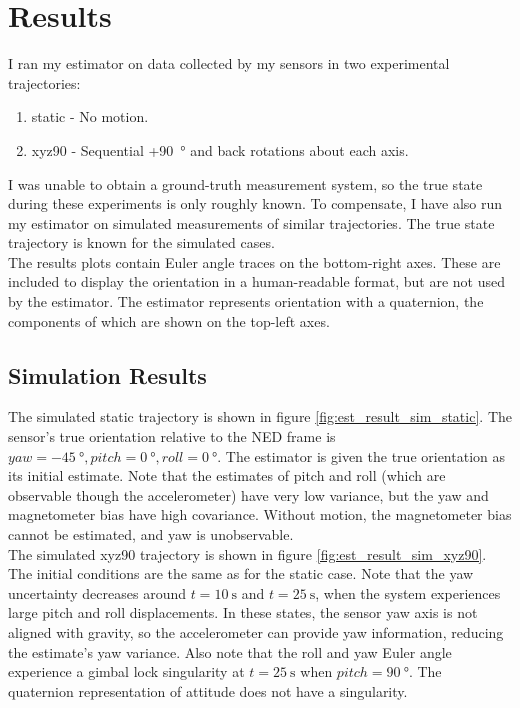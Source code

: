 \documentclass[conference]{IEEEtran}
\begin{document}
\section{Results}
I ran my estimator on data collected by my sensors in two experimental trajectories:
\begin{enumerate}
    \item static - No motion.
    \item xyz90 - Sequential +\SI{90}{\degree} and back rotations about each axis.
\end{enumerate}
I was unable to obtain a ground-truth measurement system, so the true state during these experiments is only roughly known. To compensate, I have also run my estimator on simulated measurements of similar trajectories. The true state trajectory is known for the simulated cases.\\
The results plots contain Euler angle traces on the bottom-right axes. These are included to display the orientation in a human-readable format, but are not used by the estimator. The estimator represents orientation with a quaternion, the components of which are shown on the top-left axes.

\subsection{Simulation Results}
The simulated static trajectory is shown in figure \ref{fig:est_result_sim_static}. The sensor's true orientation relative to the NED frame is $yaw = \SI{-45}{\degree}, pitch = \SI{0}{\degree}, roll = \SI{0}{\degree}$. The estimator is given the true orientation as its initial estimate. Note that the estimates of pitch and roll (which are observable though the accelerometer) have very low variance, but the yaw and magnetometer bias have high covariance. Without motion, the magnetometer bias cannot be estimated, and yaw is unobservable. \\

The simulated xyz90 trajectory is shown in figure \ref{fig:est_result_sim_xyz90}. The initial conditions are the same as for the static case. Note that the yaw uncertainty decreases around $t=\SI{10}{\second}$ and $t = \SI{25}{\second}$, when the system experiences large pitch and roll displacements. In these states, the sensor yaw axis is not aligned with gravity, so the accelerometer can provide yaw information, reducing the estimate's yaw variance. Also note that the roll and yaw Euler angle experience a gimbal lock singularity at $t = \SI{25}{\second}$ when $pitch=\SI{90}{\degree}$. The quaternion representation of attitude does not have a singularity. 
\end{document}
